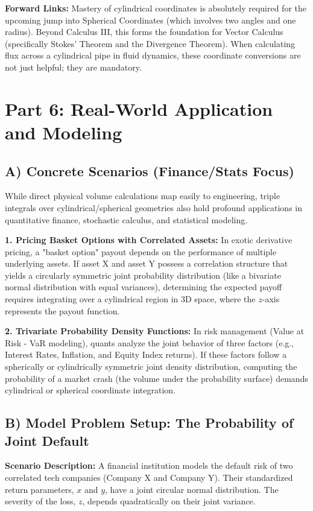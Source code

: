 \documentclass[11pt]{article}
\begin{document}
\textbf{Forward Links:} Mastery of cylindrical coordinates is absolutely required for the upcoming jump into Spherical Coordinates (which involves two angles and one radius). Beyond Calculus III, this forms the foundation for Vector Calculus (specifically Stokes' Theorem and the Divergence Theorem). When calculating flux across a cylindrical pipe in fluid dynamics, these coordinate conversions are not just helpful; they are mandatory. 

\newpage
\section{Part 6: Real-World Application and Modeling}

\subsection{A) Concrete Scenarios (Finance/Stats Focus)}
While direct physical volume calculations map easily to engineering, triple integrals over cylindrical/spherical geometries also hold profound applications in quantitative finance, stochastic calculus, and statistical modeling. 

\textbf{1. Pricing Basket Options with Correlated Assets:} In exotic derivative pricing, a "basket option" payout depends on the performance of multiple underlying assets. If asset X and asset Y possess a correlation structure that yields a circularly symmetric joint probability distribution (like a bivariate normal distribution with equal variances), determining the expected payoff requires integrating over a cylindrical region in 3D space, where the $z$-axis represents the payout function.

\textbf{2. Trivariate Probability Density Functions:} In risk management (Value at Risk - VaR modeling), quants analyze the joint behavior of three factors (e.g., Interest Rates, Inflation, and Equity Index returns). If these factors follow a spherically or cylindrically symmetric joint density distribution, computing the probability of a market crash (the volume under the probability surface) demands cylindrical or spherical coordinate integration.

\subsection{B) Model Problem Setup: The Probability of Joint Default}
\textbf{Scenario Description:} A financial institution models the default risk of two correlated tech companies (Company X and Company Y). Their standardized return parameters, $x$ and $y$, have a joint circular normal distribution. The severity of the loss, $z$, depends quadratically on their joint variance. 
\end{document}
